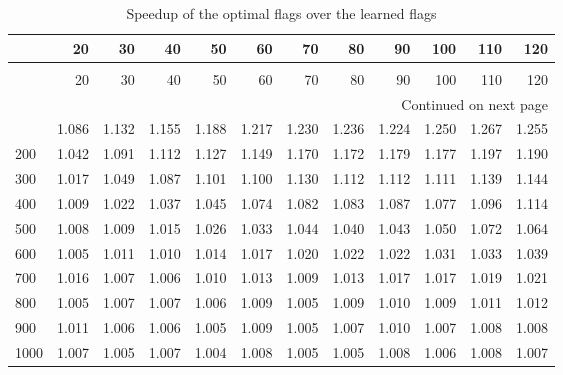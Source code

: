 \begin{longtable}{lrrrrrrrrrrr}
\caption{Speedup of the optimal flags over the learned flags} \label{table:simulation-speedup-optimal} \\
\toprule
 & 20 & 30 & 40 & 50 & 60 & 70 & 80 & 90 & 100 & 110 & 120 \\
\midrule
\endfirsthead
\caption[]{Speedup of the optimal flags over the learned flags} \\
\toprule
 & 20 & 30 & 40 & 50 & 60 & 70 & 80 & 90 & 100 & 110 & 120 \\
\midrule
\endhead
\midrule
\multicolumn{12}{r}{Continued on next page} \\
\midrule
\endfoot
\bottomrule
\endlastfoot
100 & 1.086 & 1.132 & 1.155 & 1.188 & 1.217 & 1.230 & 1.236 & 1.224 & 1.250 & 1.267 & 1.255 \\
200 & 1.042 & 1.091 & 1.112 & 1.127 & 1.149 & 1.170 & 1.172 & 1.179 & 1.177 & 1.197 & 1.190 \\
300 & 1.017 & 1.049 & 1.087 & 1.101 & 1.100 & 1.130 & 1.112 & 1.112 & 1.111 & 1.139 & 1.144 \\
400 & 1.009 & 1.022 & 1.037 & 1.045 & 1.074 & 1.082 & 1.083 & 1.087 & 1.077 & 1.096 & 1.114 \\
500 & 1.008 & 1.009 & 1.015 & 1.026 & 1.033 & 1.044 & 1.040 & 1.043 & 1.050 & 1.072 & 1.064 \\
600 & 1.005 & 1.011 & 1.010 & 1.014 & 1.017 & 1.020 & 1.022 & 1.022 & 1.031 & 1.033 & 1.039 \\
700 & 1.016 & 1.007 & 1.006 & 1.010 & 1.013 & 1.009 & 1.013 & 1.017 & 1.017 & 1.019 & 1.021 \\
800 & 1.005 & 1.007 & 1.007 & 1.006 & 1.009 & 1.005 & 1.009 & 1.010 & 1.009 & 1.011 & 1.012 \\
900 & 1.011 & 1.006 & 1.006 & 1.005 & 1.009 & 1.005 & 1.007 & 1.010 & 1.007 & 1.008 & 1.008 \\
1000 & 1.007 & 1.005 & 1.007 & 1.004 & 1.008 & 1.005 & 1.005 & 1.008 & 1.006 & 1.008 & 1.007 \\
\end{longtable}
